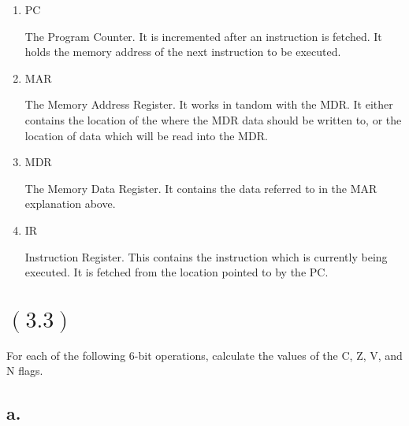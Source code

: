 \documentclass[letterpaper,12pt,titlepage]{article}
\begin{document}
\renewcommand{\labelenumi}{\alph{enumi})}
\begin{enumerate}
\item PC

\begin{mdframed}[style=MyFrame]

The Program Counter. It is incremented after an instruction is fetched. It holds the memory address of the next instruction to be executed.

\end{mdframed}

\item MAR

\begin{mdframed}[style=MyFrame]

The Memory Address Register. It works in tandom with the MDR. It either contains the location of the where the MDR data should be written to, or the location of data which will be read into the MDR.

\end{mdframed}

\item MDR 

\begin{mdframed}[style=MyFrame]

The Memory Data Register. It contains the data referred to in the MAR explanation above.

\end{mdframed}

\item IR

\begin{mdframed}[style=MyFrame]

Instruction Register. This contains the instruction which is currently being executed. It is fetched from the location pointed to by the PC.

\end{mdframed}

\end{enumerate}

\section*{$(3.3)$} For each of the following 6-bit operations, calculate the values of the C, Z, V, and N flags.

\subsection*{a.}
\end{document}
